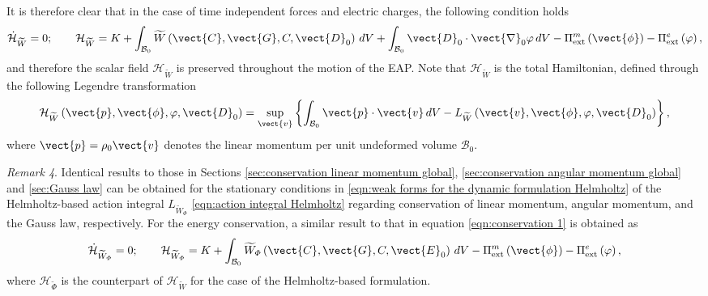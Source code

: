 It is therefore clear that in the case of time independent forces and electric charges, the following condition holds
%
\begin{equation}\label{eqn:conservation 1}
\dot{\mathcal{H}}_{\widetilde{W}} = 0;\qquad
\mathcal{H}_{\widetilde{W}} =K + \int_{\mathcal{B}_0}\widetilde{W}\left(\vect{C},\vect{G},C,\vect{D}_0\right)\,dV + \int_{\mathcal{B}_0}\vect{D}_0\cdot\vect{\nabla}_0\varphi\,dV - \Pi^m_{\text{ext}}\left(\vect{\phi}\right) - \Pi^e_{\text{ext}}\left(\varphi\right),
\end{equation}
%
and therefore the scalar field $\mathcal{H}_{\widetilde{W}}$ is preserved throughout the motion of the EAP. 
Note that $\mathcal{H}_{\widetilde{W}}$ is the total Hamiltonian, defined through the following Legendre transformation
%
\begin{equation}\label{eqn:legendre transform for the Hamiltonian}
\mathcal{H}_{\widetilde{W}}\left(\vect{p},\vect{\phi},\varphi,\vect{D}_0\right) = \sup_{\vect{v}}\left\{\int_{\mathcal{B}_0}\vect{p}\cdot\vect{v}\,dV - L_{\widetilde{W}}\left(\vect{v},\vect{\phi},\varphi,\vect{D}_0\right)\right\},
\end{equation}
%
where $\vect{p} = \rho_0\vect{v}$ denotes the linear momentum per unit undeformed volume $\mathcal{B}_0$.
%

\noindent\makebox[\linewidth]{\rule{\textwidth}{0.4pt}}

\noindent \textit{Remark 4}. Identical results to those in Sections \ref{sec:conservation linear momentum global}, \ref{sec:conservation angular momentum global} and \ref{sec:Gauss law} can be obtained for the stationary conditions in \eqref{eqn:weak forms for the dynamic formulation Helmholtz} of the Helmholtz-based action integral $L_{\widetilde{W}_{\varPhi}}$ \eqref{eqn:action integral Helmholtz} regarding conservation of linear momentum, angular momentum, and the Gauss law, respectively. 
For the energy conservation, a similar result to that in equation \eqref{eqn:conservation 1} is obtained as
%
\begin{equation}\label{eqn:conservation 1 Helmholtz}
\dot{\mathcal{H}}_{\widetilde{W}_{\varPhi}} = 0;\qquad
\mathcal{H}_{\widetilde{W}_{\varPhi}} =K + \int_{\mathcal{B}_0}\widetilde{W}_{\varPhi}\left(\vect{C},\vect{G},C,\vect{E}_0\right)\,dV  - \Pi^m_{\text{ext}}\left(\vect{\phi}\right) - \Pi^e_{\text{ext}}\left(\varphi\right),
\end{equation}
%
where $\mathcal{H}_{\widetilde{\varPhi}}$ is the counterpart of $\mathcal{H}_{\widetilde{W}}$ for the case of the Helmholtz-based formulation. 

